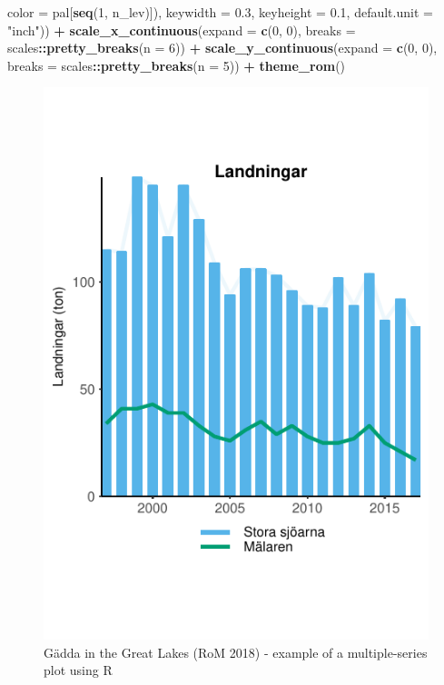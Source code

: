 \documentclass[]{article}
\newenvironment{Shaded}{\begin{snugshade}}{\end{snugshade}}
\newcommand{\KeywordTok}[1]{\textcolor[rgb]{0.13,0.29,0.53}{\textbf{#1}}}
\newcommand{\DataTypeTok}[1]{\textcolor[rgb]{0.13,0.29,0.53}{#1}}
\newcommand{\DecValTok}[1]{\textcolor[rgb]{0.00,0.00,0.81}{#1}}
\newcommand{\FloatTok}[1]{\textcolor[rgb]{0.00,0.00,0.81}{#1}}
\newcommand{\StringTok}[1]{\textcolor[rgb]{0.31,0.60,0.02}{#1}}
\newcommand{\OperatorTok}[1]{\textcolor[rgb]{0.81,0.36,0.00}{\textbf{#1}}}
\newcommand{\NormalTok}[1]{#1}
\begin{document}
\begin{Shaded}
\begin{Highlighting}[]
                                                  \DataTypeTok{color =}\NormalTok{ pal[}\KeywordTok{seq}\NormalTok{(}\DecValTok{1}\NormalTok{, n_lev)]),}
                              \DataTypeTok{keywidth =} \FloatTok{0.3}\NormalTok{,}
                              \DataTypeTok{keyheight =} \FloatTok{0.1}\NormalTok{,}
                              \DataTypeTok{default.unit =} \StringTok{"inch"}\NormalTok{)) }\OperatorTok{+}
\StringTok{  }\KeywordTok{scale_x_continuous}\NormalTok{(}\DataTypeTok{expand =} \KeywordTok{c}\NormalTok{(}\DecValTok{0}\NormalTok{, }\DecValTok{0}\NormalTok{), }\DataTypeTok{breaks =}\NormalTok{ scales}\OperatorTok{::}\KeywordTok{pretty_breaks}\NormalTok{(}\DataTypeTok{n =} \DecValTok{6}\NormalTok{)) }\OperatorTok{+}
\StringTok{  }\KeywordTok{scale_y_continuous}\NormalTok{(}\DataTypeTok{expand =} \KeywordTok{c}\NormalTok{(}\DecValTok{0}\NormalTok{, }\DecValTok{0}\NormalTok{), }\DataTypeTok{breaks =}\NormalTok{ scales}\OperatorTok{::}\KeywordTok{pretty_breaks}\NormalTok{(}\DataTypeTok{n =} \DecValTok{5}\NormalTok{)) }\OperatorTok{+}
\StringTok{  }\KeywordTok{theme_rom}\NormalTok{()}
\end{Highlighting}
\end{Shaded}

\begin{figure}

{\centering \includegraphics{Making_figures_for_RoM_in_R_files/figure-latex/plot 2a-1} 

}

\caption{Gädda in the Great Lakes (RoM 2018) - example of a multiple-series plot using R}\label{fig:plot 2a}
\end{figure}
\end{document}
